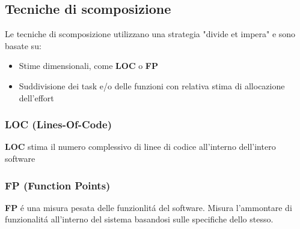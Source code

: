 \documentclass[11pt]{article}
\begin{document}
\subsection{Tecniche di scomposizione}
\label{sec:orga78aac6}
Le tecniche di scomposizione utilizzano una strategia "divide et impera" e sono basate su:
\begin{itemize}
\item Stime dimensionali, come \textbf{\textbf{LOC}} o \textbf{\textbf{FP}}
\item Suddivisione dei task e/o delle funzioni con relativa stima di allocazione dell'effort
\end{itemize}
\subsubsection{LOC (Lines-Of-Code)}
\label{sec:org8e1e193}
\textbf{\textbf{LOC}} stima il numero complessivo di linee di codice all'interno dell'intero software
\subsubsection{FP (Function Points)}
\label{sec:org04eae40}
\textbf{\textbf{FP}} é una misura pesata delle funzionlitá del software.
Misura l'ammontare di funzionalitá all'interno del sistema basandosi sulle specifiche dello stesso.
\end{document}
